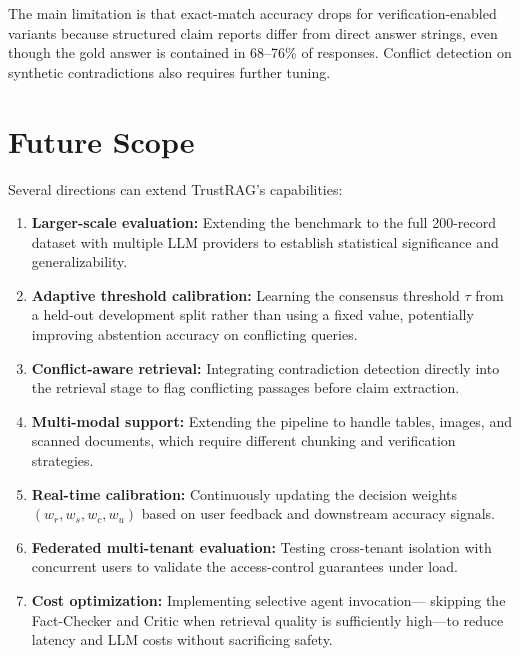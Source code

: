 \documentclass[conference]{IEEEtran}
\begin{document}
The main limitation is that exact-match accuracy drops for verification-enabled
variants because structured claim reports differ from direct answer strings,
even though the gold answer is contained in 68--76\% of responses. Conflict
detection on synthetic contradictions also requires further tuning.

\section{Future Scope}
\label{sec:future}

Several directions can extend TrustRAG's capabilities:

\begin{enumerate}
  \item \textbf{Larger-scale evaluation:} Extending the benchmark to the full
    200-record dataset with multiple LLM providers to establish statistical
    significance and generalizability.
  \item \textbf{Adaptive threshold calibration:} Learning the consensus threshold
    $\tau$ from a held-out development split rather than using a fixed value,
    potentially improving abstention accuracy on conflicting queries.
  \item \textbf{Conflict-aware retrieval:} Integrating contradiction detection
    directly into the retrieval stage to flag conflicting passages before
    claim extraction.
  \item \textbf{Multi-modal support:} Extending the pipeline to handle tables,
    images, and scanned documents, which require different chunking and
    verification strategies.
  \item \textbf{Real-time calibration:} Continuously updating the decision
    weights $(w_r, w_s, w_c, w_u)$ based on user feedback and downstream
    accuracy signals.
  \item \textbf{Federated multi-tenant evaluation:} Testing cross-tenant
    isolation with concurrent users to validate the access-control guarantees
    under load.
  \item \textbf{Cost optimization:} Implementing selective agent invocation---
    skipping the Fact-Checker and Critic when retrieval quality is sufficiently
    high---to reduce latency and LLM costs without sacrificing safety.
\end{enumerate}
\end{document}
